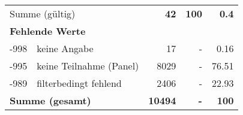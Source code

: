 \begin{longtable}{lXrrr}
     \midrule
     \multicolumn{2}{l}{Summe (gültig)} &
       \textbf{\num{42}} &
     \textbf{100} &
       \textbf{\num[round-mode=places,round-precision=2]{0,4}} \\
     \multicolumn{5}{l}{\textbf{Fehlende Werte}}\\
       -998 &
       keine Angabe &
         \num{17} &
        - &
         \num[round-mode=places,round-precision=2]{0,16} \\
       -995 &
       keine Teilnahme (Panel) &
         \num{8029} &
        - &
         \num[round-mode=places,round-precision=2]{76,51} \\
       -989 &
       filterbedingt fehlend &
         \num{2406} &
        - &
         \num[round-mode=places,round-precision=2]{22,93} \\
     \midrule
     \multicolumn{2}{l}{\textbf{Summe (gesamt)}} &
          \textbf{\num{10494}} &
        \textbf{-} &
        \textbf{100} \\
     \bottomrule
     \end{longtable}
     
